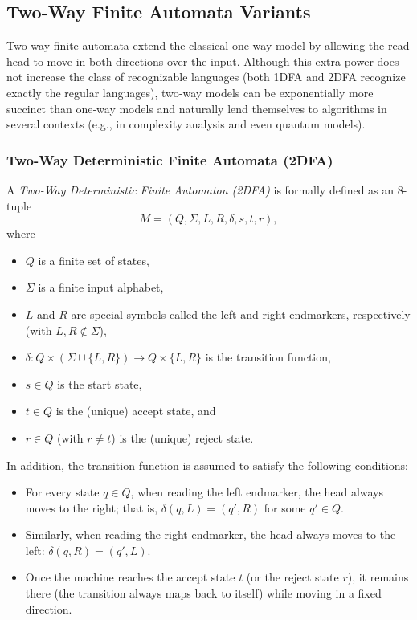 \subsection{Two-Way Finite Automata Variants}
\label{subsec:two-way-variants}

Two-way finite automata extend the classical one‐way model by allowing the read head to move in both directions over the input. Although this extra power does not increase the class of recognizable languages (both 1DFA and 2DFA recognize exactly the regular languages), two‐way models can be exponentially more succinct than one‐way models and naturally lend themselves to algorithms in several contexts (e.g., in complexity analysis and even quantum models).

\subsubsection{Two-Way Deterministic Finite Automata (2DFA)}
\label{subsubsec:2dfa}

A \emph{Two-Way Deterministic Finite Automaton (2DFA)} is formally defined as an 8-tuple 
\[
M = (Q, \Sigma, L, R, \delta, s, t, r),
\]
where
\begin{itemize}
  \item \(Q\) is a finite set of states,
  \item \(\Sigma\) is a finite input alphabet,
  \item \(L\) and \(R\) are special symbols called the left and right endmarkers, respectively (with \(L,R \notin \Sigma\)),
  \item \(\delta: Q \times (\Sigma \cup \{L, R\}) \to Q \times \{L, R\}\) is the transition function,
  \item \(s\in Q\) is the start state,
  \item \(t\in Q\) is the (unique) accept state, and
  \item \(r\in Q\) (with \(r\neq t\)) is the (unique) reject state.
\end{itemize}
In addition, the transition function is assumed to satisfy the following conditions:
\begin{itemize}
  \item For every state \(q\in Q\), when reading the left endmarker, the head always moves to the right; that is, \(\delta(q,L) = (q', R)\) for some \(q'\in Q\).
  \item Similarly, when reading the right endmarker, the head always moves to the left: \(\delta(q,R) = (q', L)\).
  \item Once the machine reaches the accept state \(t\) (or the reject state \(r\)), it remains there (the transition always maps back to itself) while moving in a fixed direction.
\end{itemize}

